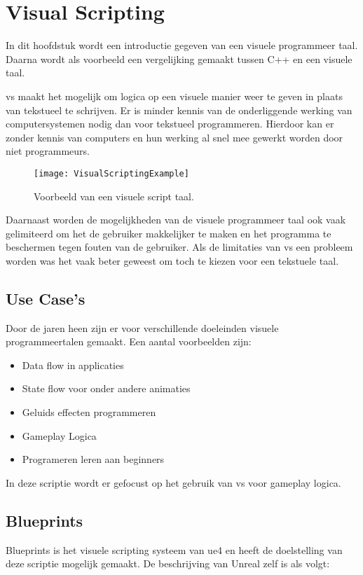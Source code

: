 \lstset {language=C++}

\chapter{Visual Scripting}
\label{ch:visualscripting}
In dit hoofdstuk wordt een introductie gegeven van een visuele programmeer taal. Daarna wordt als voorbeeld een vergelijking gemaakt tussen C++ en een visuele taal.

\gls{vs} maakt het mogelijk om logica op een visuele manier weer te geven in plaats van tekstueel te schrijven. Er is minder kennis van de onderliggende werking van computersystemen nodig dan voor tekstueel programmeren. Hierdoor kan er zonder kennis van computers en hun werking al snel mee gewerkt worden door niet programmeurs. 

\begin{figure}[!ht]
  \centering
    \texttt{[image: VisualScriptingExample]}
    \caption{Voorbeeld van een visuele script taal.}
\end{figure}

Daarnaast worden de mogelijkheden van de visuele programmeer taal ook vaak gelimiteerd om het de gebruiker makkelijker te maken en het programma te beschermen tegen fouten van de gebruiker. Als de limitaties van \gls{vs} een probleem worden was het vaak beter geweest om toch te kiezen voor een tekstuele taal.

\section{Use Case's}
Door de jaren heen zijn er voor verschillende doeleinden visuele programmeertalen gemaakt. 
Een aantal voorbeelden zijn:

\begin{itemize}  
\item Data flow in applicaties 
\item State flow voor onder andere animaties 
\item Geluids effecten programmeren
\item Gameplay Logica 
\item Programeren leren aan beginners 
\end{itemize}

In deze scriptie wordt er gefocust op het gebruik van \gls{vs} voor gameplay logica.

\section{Blueprints}
Blueprints is het visuele scripting systeem van \gls{ue4} en heeft de doelstelling van deze scriptie mogelijk gemaakt. De beschrijving van Unreal zelf is als volgt:

